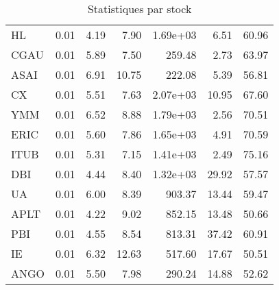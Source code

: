 \begin{table}[H]
\begin{tabular}{lrrrrrr}
HL & 0.01 & 4.19 & 7.90 & 1.69e+03 & 6.51 & 60.96 \\
CGAU & 0.01 & 5.89 & 7.50 & 259.48 & 2.73 & 63.97 \\
ASAI & 0.01 & 6.91 & 10.75 & 222.08 & 5.39 & 56.81 \\
CX & 0.01 & 5.51 & 7.63 & 2.07e+03 & 10.95 & 67.60 \\
YMM & 0.01 & 6.52 & 8.88 & 1.79e+03 & 2.56 & 70.51 \\
ERIC & 0.01 & 5.60 & 7.86 & 1.65e+03 & 4.91 & 70.59 \\
ITUB & 0.01 & 5.31 & 7.15 & 1.41e+03 & 2.49 & 75.16 \\
DBI & 0.01 & 4.44 & 8.40 & 1.32e+03 & 29.92 & 57.57 \\
UA & 0.01 & 6.00 & 8.39 & 903.37 & 13.44 & 59.47 \\
APLT & 0.01 & 4.22 & 9.02 & 852.15 & 13.48 & 50.66 \\
PBI & 0.01 & 4.55 & 8.54 & 813.31 & 37.42 & 60.91 \\
IE & 0.01 & 6.32 & 12.63 & 517.60 & 17.67 & 50.51 \\
ANGO & 0.01 & 5.50 & 7.98 & 290.24 & 14.88 & 52.62 \\
\bottomrule
\end{tabular}
\caption{Statistiques par stock}
\end{table}